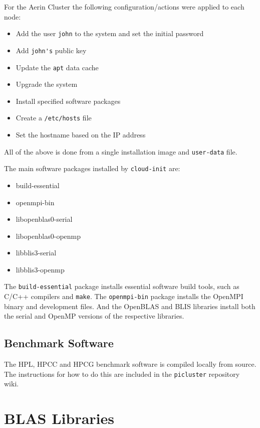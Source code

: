 For the Aerin Cluster the following configuration/actions were applied to each node:

\begin{itemize}
\item Add the user \verb|john| to the system and set the initial password 
\item Add \verb|john's| public key
\item Update the \verb|apt| data cache
\item Upgrade the system
\item Install specified software packages
\item Create a \verb|/etc/hosts| file
\item Set the hostname based on the IP address
\end{itemize}

All of the above is done from a single installation image and \verb|user-data| file.

The main software packages installed by \verb|cloud-init| are:

\begin{itemize}
\item build-essential
\item openmpi-bin
\item libopenblas0-serial
\item libopenblas0-openmp
\item libblis3-serial
\item libblis3-openmp
\end{itemize}

The \verb|build-essential| package installs essential software build tools, such as C/C++ compilers and \verb|make|. The \verb|openmpi-bin| package installs the OpenMPI binary and development files. And the OpenBLAS and BLIS libraries install both the serial and OpenMP versions of the respective libraries. 


%
%
\subsection{Benchmark Software}

The HPL, HPCC and HPCG benchmark software is compiled locally from source. The instructions for how to do this are included in the \verb|picluster| repository wiki.


%
%
\section{BLAS Libraries}

